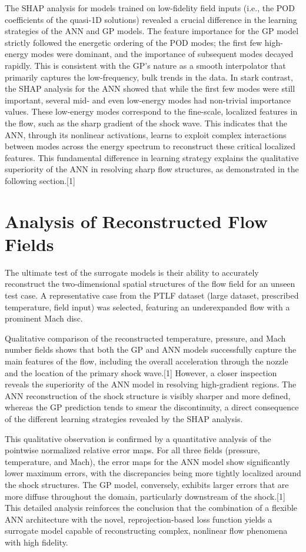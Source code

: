 \documentclass[12pt, a4paper]{report}
\begin{document}
The SHAP analysis for models trained on low-fidelity field inputs (i.e., the POD coefficients of the quasi-1D solutions) revealed a crucial difference in the learning strategies of the ANN and GP models. The feature importance for the GP model strictly followed the energetic ordering of the POD modes; the first few high-energy modes were dominant, and the importance of subsequent modes decayed rapidly. This is consistent with the GP's nature as a smooth interpolator that primarily captures the low-frequency, bulk trends in the data. In stark contrast, the SHAP analysis for the ANN showed that while the first few modes were still important, several mid- and even low-energy modes had non-trivial importance values. These low-energy modes correspond to the fine-scale, localized features in the flow, such as the sharp gradient of the shock wave. This indicates that the ANN, through its nonlinear activations, learns to exploit complex interactions between modes across the energy spectrum to reconstruct these critical localized features. This fundamental difference in learning strategy explains the qualitative superiority of the ANN in resolving sharp flow structures, as demonstrated in the following section.[1]

\section{Analysis of Reconstructed Flow Fields}

The ultimate test of the surrogate models is their ability to accurately reconstruct the two-dimensional spatial structures of the flow field for an unseen test case. A representative case from the PTLF dataset (large dataset, prescribed temperature, field input) was selected, featuring an underexpanded flow with a prominent Mach disc.

Qualitative comparison of the reconstructed temperature, pressure, and Mach number fields shows that both the GP and ANN models successfully capture the main features of the flow, including the overall acceleration through the nozzle and the location of the primary shock wave.[1] However, a closer inspection reveals the superiority of the ANN model in resolving high-gradient regions. The ANN reconstruction of the shock structure is visibly sharper and more defined, whereas the GP prediction tends to smear the discontinuity, a direct consequence of the different learning strategies revealed by the SHAP analysis.

This qualitative observation is confirmed by a quantitative analysis of the pointwise normalized relative error maps. For all three fields (pressure, temperature, and Mach), the error maps for the ANN model show significantly lower maximum errors, with the discrepancies being more tightly localized around the shock structures. The GP model, conversely, exhibits larger errors that are more diffuse throughout the domain, particularly downstream of the shock.[1] This detailed analysis reinforces the conclusion that the combination of a flexible ANN architecture with the novel, reprojection-based loss function yields a surrogate model capable of reconstructing complex, nonlinear flow phenomena with high fidelity.
\end{document}
